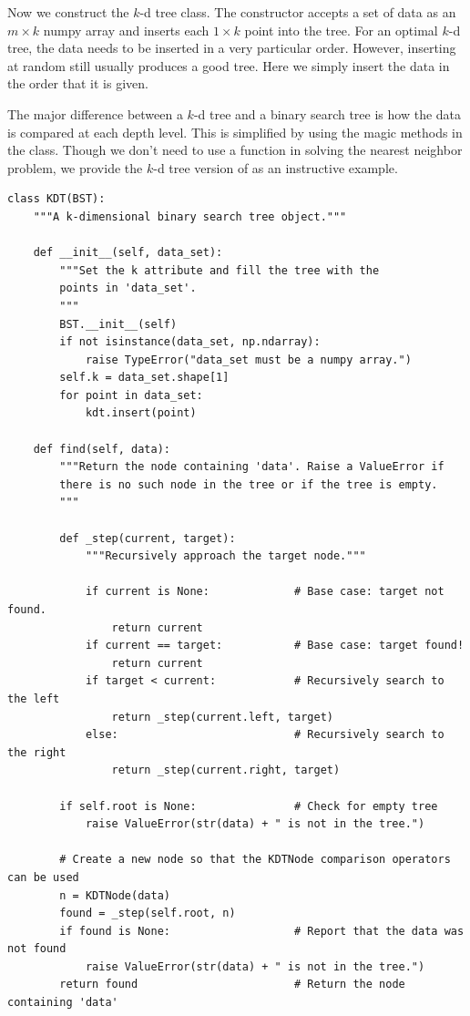 Now we construct the $k$-d tree class.
The constructor accepts a set of data as an $m \times k$ numpy array and inserts each $1 \times k$ point into the tree.
For an optimal $k$-d tree, the data needs to be inserted in a very particular order.
However, inserting at random still usually produces a good tree.
Here we simply insert the data in the order that it is given.

The major difference between a $k$-d tree and a binary search tree is how the data is compared at each depth level.
This is simplified by using the magic methods in the  class.
Though we don't need to use a  function in solving the nearest neighbor problem, we provide the $k$-d tree version of  as an instructive example.
%
\begin{lstlisting}
class KDT(BST):
    """A k-dimensional binary search tree object."""

    def __init__(self, data_set):
        """Set the k attribute and fill the tree with the
        points in 'data_set'.
        """
        BST.__init__(self)
        if not isinstance(data_set, np.ndarray):
            raise TypeError("data_set must be a numpy array.")
        self.k = data_set.shape[1]
        for point in data_set:
            kdt.insert(point)

	def find(self, data):
		"""Return the node containing 'data'. Raise a ValueError if
        there is no such node in the tree or if the tree is empty.
        """
		
		def _step(current, target):
			"""Recursively approach the target node."""
			
			if current is None:				# Base case: target not found.
				return current
			if current == target:	        # Base case: target found!
				return current
			if target < current:			# Recursively search to the left
				return _step(current.left, target)
			else:							# Recursively search to the right
				return _step(current.right, target)
			
		if self.root is None:				# Check for empty tree
			raise ValueError(str(data) + " is not in the tree.")
		
		# Create a new node so that the KDTNode comparison operators can be used
		n = KDTNode(data)
		found = _step(self.root, n)
		if found is None:					# Report that the data was not found
			raise ValueError(str(data) + " is not in the tree.")
		return found						# Return the node containing 'data'
\end{lstlisting}

